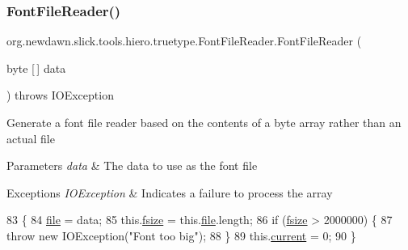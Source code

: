 \subsubsection{\texorpdfstring{Font\+File\+Reader()}{FontFileReader()}\hspace{0.1cm}{\footnotesize\ttfamily [2/3]}}
{\footnotesize\ttfamily org.\+newdawn.\+slick.\+tools.\+hiero.\+truetype.\+Font\+File\+Reader.\+Font\+File\+Reader (\begin{DoxyParamCaption}\item[{byte \mbox{[}$\,$\mbox{]}}]{data }\end{DoxyParamCaption}) throws I\+O\+Exception\hspace{0.3cm}{\ttfamily [inline]}}

Generate a font file reader based on the contents of a byte array rather than an actual file


\begin{DoxyParams}{Parameters}
{\em data} & The data to use as the font file \\
\hline
\end{DoxyParams}

\begin{DoxyExceptions}{Exceptions}
{\em I\+O\+Exception} & Indicates a failure to process the array \\
\hline
\end{DoxyExceptions}

\begin{DoxyCode}
83                                                           \{
84         \mbox{\hyperlink{classorg_1_1newdawn_1_1slick_1_1tools_1_1hiero_1_1truetype_1_1_font_file_reader_ab4c57b8a3e3eba60293c11bf50d7cc42}{file}} = data;
85         this.\mbox{\hyperlink{classorg_1_1newdawn_1_1slick_1_1tools_1_1hiero_1_1truetype_1_1_font_file_reader_a247fb2663cf669a7842919c405f41bfe}{fsize}} = this.\mbox{\hyperlink{classorg_1_1newdawn_1_1slick_1_1tools_1_1hiero_1_1truetype_1_1_font_file_reader_ab4c57b8a3e3eba60293c11bf50d7cc42}{file}}.length;
86         \textcolor{keywordflow}{if} (\mbox{\hyperlink{classorg_1_1newdawn_1_1slick_1_1tools_1_1hiero_1_1truetype_1_1_font_file_reader_a247fb2663cf669a7842919c405f41bfe}{fsize}} > 2000000) \{
87             \textcolor{keywordflow}{throw} \textcolor{keyword}{new} IOException(\textcolor{stringliteral}{"Font too big"});
88         \}
89         this.\mbox{\hyperlink{classorg_1_1newdawn_1_1slick_1_1tools_1_1hiero_1_1truetype_1_1_font_file_reader_ab082d04b7f0a287496055b8e5f203cb4}{current}} = 0;
90     \}
\end{DoxyCode}
\mbox{\label{classorg_1_1newdawn_1_1slick_1_1tools_1_1hiero_1_1truetype_1_1_font_file_reader_ab5d4e15afe03d1a90be3282bd62efd67}} 
